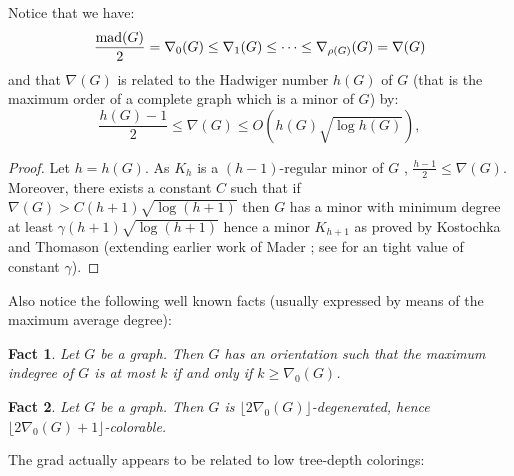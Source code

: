 \documentclass[a4paper]{amsart}
\newtheorem{fact}{Fact}[section]
\theoremstyle{definition}
\theoremstyle{remark}
\DeclareMathOperator\mad{{\rm mad}}
\newcommand{\rdens}[1]{\nabla_{#1}}
\newcommand{\dens}{\nabla}
\begin{document}
Notice that we have:
\begin{equation}
  \frac{\mad(G)}{2}=\rdens{0}(G)\leq\rdens{1}(G)\leq\dotsb\leq\rdens{\rho(G)}(G)=\dens(G)
\end{equation}
and that $\dens(G)$ is related to the Hadwiger number $h(G)$ of $G$
(that is the maximum order of a complete graph which is a minor of $G$)
by:
\begin{equation}
\frac{h(G)-1}{2}\leq\dens(G)\leq O(h(G)\sqrt{\log h(G)}),
\end{equation}
\begin{proof}
Let $h=h(G)$. As $K_h$ is a $(h-1)$-regular minor of $G$ ,
$\frac{h-1}{2}\leq\dens(G)$. Moreover, there exists a constant $C$
such that if $\dens(G) > C (h+1)\sqrt{\log (h+1)}$ then $G$ has a minor with
minimum degree at least $\gamma (h+1)\sqrt{\log (h+1)}$ hence a minor
$K_{h+1}$ as proved by  Kostochka \cite{Ko} and Thomason \cite{TH1}
(extending earlier work of Mader \cite{M}; see \cite{Th2} for an tight
value of constant $\gamma$).
\end{proof}



Also notice the following well known facts (usually expressed by means
of the maximum average degree):
\begin{fact}
\label{fact:md}
Let $G$ be a graph. Then $G$ has an orientation such that the maximum
indegree of $G$ is at most $k$ if and only if $k\geq \rdens{0}(G)$.
\end{fact}
\begin{fact}
Let $G$ be a graph. Then $G$ is $\lfloor
2\rdens{0}(G)\rfloor$-degenerated, hence 
$\lfloor 2\rdens{0}(G)+1\rfloor$-colorable.
\end{fact}


The grad actually appears to be related to low tree-depth colorings:
\end{document}
